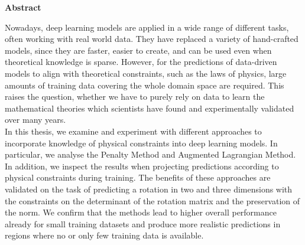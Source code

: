 


\vspace*{2cm}
\begin{center}
{\Large \textbf{Abstract}}
\end{center}
\vspace{1cm}


Nowadays, deep learning models are applied in a wide range of different tasks, often working with real world data. They have replaced a variety of hand-crafted models, since they are faster, easier to create, and can be used even when theoretical knowledge is sparse. However, for the predictions of data-driven models to align with theoretical constraints, such as the laws of physics, large amounts of training data covering the whole domain space are required. This raises the question, whether we have to purely rely on data to learn the mathematical theories which scientists have found and experimentally validated over many years. \\
\indent In this thesis, we examine and experiment with different approaches to incorporate knowledge of physical constraints into deep learning models. In particular, we analyse the Penalty Method and Augmented Lagrangian Method. In addition, we inspect the results when projecting predictions according to physical constraints during training. The benefits of these approaches are validated on the task of predicting a rotation in two and three dimensions with the constraints on the determinant of the rotation matrix and the preservation of the norm. We confirm that the methods lead to higher overall performance already for small training datasets and produce more realistic predictions in regions where no or only few training data is available.
